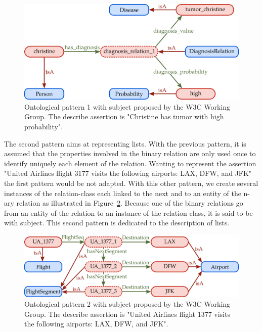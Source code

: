 \begin{figure}[ht!]
\centering
\includegraphics[scale=0.4]{figures/chapter7/w3c_p1.png}
\caption{\label{fig:chap7_w3c_p1} Ontological pattern 1 with subject proposed by the W3C Working Group. The describe assertion is "Christine has tumor with high probability".}
\end{figure}

The second pattern aims at representing lists. With the previous pattern, it is assumed that the properties involved in the binary relation are only used once to identify uniquely each element of the relation. Wanting to represent the assertion "United Airlines flight 3177 visits the following airports: LAX, DFW, and JFK" the first pattern would be not adapted. With this other pattern, we create several instances of the relation-class each linked to the next and to an entity of the n-ary relation as illustrated in Figure~\ref{fig:chap7_w3c_p3}. Because one of the binary relations go from an entity of the relation to an instance of the relation-class, it is said to be with subject. This second pattern is dedicated to the description of lists.

\begin{figure}[ht!]
\centering
\includegraphics[scale=0.4]{figures/chapter7/w3c_p3.png}
\caption{\label{fig:chap7_w3c_p3} Ontological pattern 2 with subject proposed by the W3C Working Group. The describe assertion is "United Airlines flight 1377 visits the following airports: LAX, DFW, and JFK".}
\end{figure}

